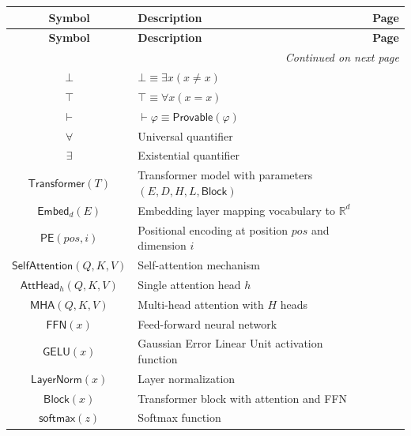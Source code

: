 \documentclass{amsart}
\newenvironment{glossarytable}{%
	\renewcommand{\arraystretch}{1.3}%
	\setlength{\tabcolsep}{4pt}%
	\begin{longtable}{|c|p{11cm}|c|}
		\hline
		\textbf{Symbol} & \textbf{Description} & \textbf{Page} \\
		\hline
		\endfirsthead
		\hline
		\textbf{Symbol} & \textbf{Description} & \textbf{Page} \\
		\hline
		\endhead
		\hline
		\multicolumn{3}{r}{\textit{Continued on next page}} \\
		\endfoot
		\hline
		\endlastfoot
}{%
	\end{longtable}%
}
\theoremstyle{break}
\newcommand{\Forall}{\forall}
\newcommand{\Exists}{\exists}
\newcommand{\R}{\mathbb{R}}
\newcommand{\IsTransformer}[1]{\mathsf{Transformer}(#1)}
\newcommand{\IsEmbedding}[2]{\mathsf{Embed}_{#2}(#1)}
\begin{document}
	\begin{glossarytable}
		$\bot$ & $\bot \equiv \exists x (x \neq x)$ & \pageref{eq:bot} \\
		$\top$ & $\top \equiv \forall x (x = x)$ & \pageref{eq:top} \\
		$\vdash$ & $\vdash \varphi \equiv \mathsf{Provable}(\varphi)$ & \pageref{eq:entailment} \\
		$\Forall$ & Universal quantifier & \pageref{eq:leibniz} \\
		$\Exists$ & Existential quantifier & \pageref{eq:leibniz} \\
		
		$\IsTransformer{T}$ & Transformer model with parameters $(E, D, H, L, \mathsf{Block})$ & \pageref{def:transformer} \\
		$\IsEmbedding{E}{d}$ & Embedding layer mapping vocabulary to $\R^d$ & \pageref{def:embedding} \\
		$\mathsf{PE}(pos, i)$ & Positional encoding at position $pos$ and dimension $i$ & \pageref{def:positional-encoding} \\
		$\mathsf{SelfAttention}(Q,K,V)$ & Self-attention mechanism & \pageref{def:self-attention} \\
		$\mathsf{AttHead}_h(Q,K,V)$ & Single attention head $h$ & \pageref{def:attention-head} \\
		$\mathsf{MHA}(Q,K,V)$ & Multi-head attention with $H$ heads & \pageref{def:multi-head-attention} \\
		$\mathsf{FFN}(x)$ & Feed-forward neural network & \pageref{def:feed-forward} \\
		$\mathsf{GELU}(x)$ & Gaussian Error Linear Unit activation function & \pageref{def:gelu} \\
		$\mathsf{LayerNorm}(x)$ & Layer normalization & \pageref{def:layer-norm} \\
		$\mathsf{Block}(x)$ & Transformer block with attention and FFN & \pageref{def:transformer-block} \\
		$\mathsf{softmax}(z)$ & Softmax function & \pageref{def:softmax} \\
		

\end{glossarytable}
\end{document}
